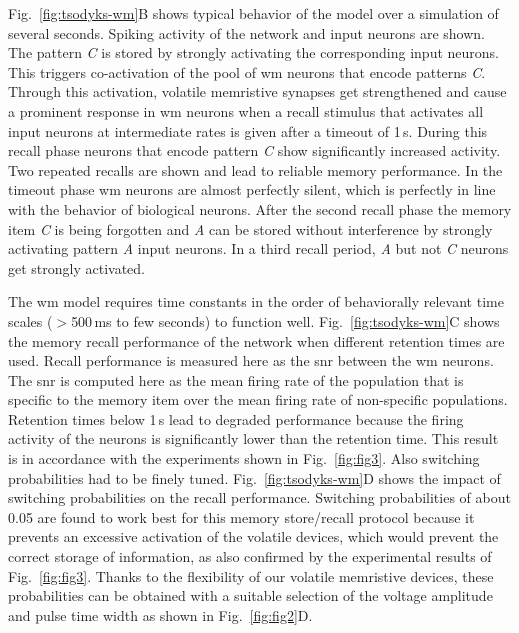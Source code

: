 Fig.~\ref{fig:tsodyks-wm}B shows typical behavior of the model over a simulation of several seconds. Spiking activity of the network and input neurons are shown. The pattern \textit{C} is stored by strongly activating the corresponding input neurons. This triggers co-activation of the pool of \gls{wm} neurons that encode patterns \textit{C}. Through this activation, volatile memristive synapses get strengthened and cause a prominent response in \gls{wm} neurons when a recall stimulus that activates all input neurons at intermediate rates is given after a timeout of 1\,s. During this recall phase neurons that encode pattern \textit{C} show significantly increased activity. Two repeated recalls are shown and lead to reliable memory performance. In the timeout phase \gls{wm} neurons are almost perfectly silent, which is perfectly in line with the behavior of biological neurons. After the second recall phase the memory item \textit{C} is being forgotten and \textit{A} can be stored without interference by strongly activating pattern \textit{A} input neurons. In a third recall period, \textit{A} but not \textit{C} neurons get strongly activated.

The \gls{wm} model requires time constants in the order of behaviorally relevant time scales ($>$500\,ms to few seconds) to function well. Fig.~\ref{fig:tsodyks-wm}C shows the  memory recall performance of the network when different retention times are used. Recall performance is measured here as the \gls{snr} between the \gls{wm} neurons. The \gls{snr} is computed here as the mean firing rate of the population that is specific to the memory item over the mean firing rate of non-specific populations. Retention times below 1\,s lead to degraded performance because the firing activity of the neurons is significantly lower than the retention time. This result is in accordance with the experiments shown in Fig.~\ref{fig:fig3}. Also switching probabilities had to be finely tuned. Fig.~\ref{fig:tsodyks-wm}D shows the impact of switching probabilities on the recall performance. Switching probabilities of about 0.05 are found to work best for this memory store/recall protocol because it prevents an excessive activation of the volatile devices, which would prevent the correct storage of information, as also confirmed by the experimental results of Fig.~\ref{fig:fig3}. Thanks to the flexibility of our volatile memristive devices, these probabilities can be obtained with a suitable selection of the voltage amplitude and pulse time width as shown in Fig.~\ref{fig:fig2}D.

